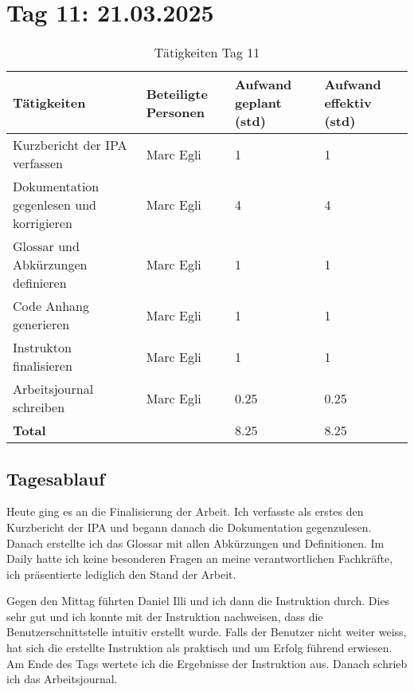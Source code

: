 \section{Tag 11: 21.03.2025}
\begin{table}[H]
    \begin{tabular}{|L{0.4\textwidth}|C{60pt}|C{60pt}|C{60pt}|}
        \hline
        \color{white}Tätigkeiten & \color{white}Beteiligte \color{white}Personen & \color{white}Aufwand geplant (std) & \color{white}Aufwand effektiv (std) \\
        \hline
         Kurzbericht der IPA verfassen & Marc Egli & 1 & 1 \\
        \hline
        Dokumentation gegenlesen und korrigieren & Marc Egli & 4 & 4 \\
        \hline
        Glossar und Abkürzungen definieren & Marc Egli & 1 & 1 \\
        \hline
        Code Anhang generieren & Marc Egli & 1 & 1 \\
        \hline
        Instrukton finalisieren & Marc Egli & 1 & 1 \\
        \hline
        Arbeitsjournal schreiben & Marc Egli & 0.25 & 0.25 \\
        \hline
        \textbf{Total} &  & 8.25 & 8.25 \\
        \hline
    \end{tabular}
    \caption{Tätigkeiten Tag 11}
\end{table}

\subsection*{Tagesablauf}
Heute ging es an die Finalisierung der Arbeit. Ich verfasste als erstes den Kurzbericht der IPA und begann danach 
die Dokumentation gegenzulesen. Danach erstellte ich das Glossar mit allen Abkürzungen und Definitionen. Im Daily hatte ich keine 
besonderen Fragen an meine verantwortlichen Fachkräfte, ich präsentierte lediglich den Stand der Arbeit.

Gegen den Mittag führten Daniel Illi und ich dann die Instruktion durch. Dies sehr gut und ich konnte mit der Instruktion nachweisen, dass 
die Benutzerschnittstelle intuitiv erstellt wurde. Falls der Benutzer nicht weiter weiss, hat sich die erstellte Instruktion als praktisch und um Erfolg führend
erwiesen. Am Ende des Tags wertete ich die Ergebnisse der Instruktion aus. Danach schrieb ich das Arbeitsjournal.

